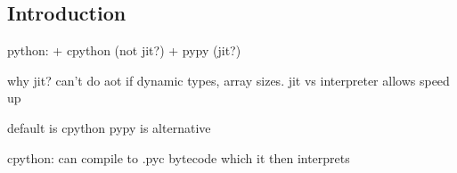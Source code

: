
\subsection{Introduction}

python:
+ cpython (not jit?)
+ pypy (jit?)

why jit? can't do aot if dynamic types, array sizes.
jit vs interpreter allows speed up


default is cpython
pypy is alternative

cpython: can compile to .pyc bytecode which it then interprets


